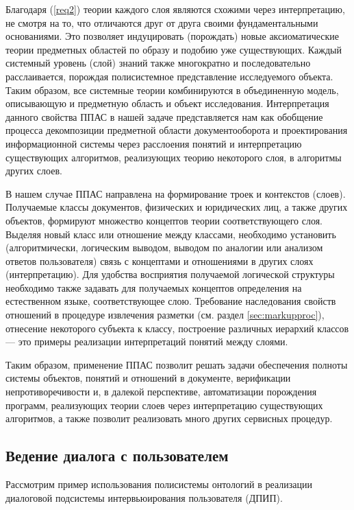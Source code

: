 \documentclass[utf8]{../IncArticle}
\begin{document}
Благодаря (\ref{req2}) теории каждого слоя являются схожими через
интерпретацию, не смотря на то, что отличаются друг от друга своими
фундаментальными основаниями.  Это позволяет индуцировать (порождать)
новые аксиоматические теории предметных областей по образу и подобию
уже существующих.  Каждый системный уровень (слой) знаний также
многократно и последовательно расслаивается, порождая полисистемное
представление исследуемого объекта.  Таким образом, все системные
теории комбинируются в объединенную модель, описывающую и предметную
область и объект исследования.  Интерпретация данного свойства ППАС в
нашей задаче представляется нам как обобщение процесса декомпозиции
предметной области документооборота и проектирования информационной
системы через расслоения понятий и интерпретацию существующих
алгоритмов, реализующих теорию некоторого слоя, в алгоритмы других
слоев.

В нашем случае ППАС направлена на формирование троек и контекстов
(слоев).  Получаемые классы документов, физических и юридических лиц,
а также других объектов, формируют множество концептов теории
соответствующего слоя.  Выделяя новый класс или отношение между
классами, необходимо установить (алгоритмически, логическим выводом,
выводом по аналогии или анализом ответов пользователя) связь с
концептами и отношениями в других слоях (интерпретацию).  Для удобства
восприятия получаемой логической структуры необходимо также задавать
для получаемых концептов определения на естественном языке,
соответствующее слою.  Требование наследования свойств отношений в
процедуре извлечения разметки (см. раздел \ref{sec:markupproc}),
отнесение некоторого субъекта к классу, построение различных иерархий
классов --- это примеры реализации интерпретаций понятий между слоями.

Таким образом, применение ППАС позволит решать задачи обеспечения
полноты системы объектов, понятий и отношений в документе, верификации
непротиворечивости и, в далекой перспективе, автоматизации порождения
программ, реализующих теории слоев через интерпретацию существующих
алгоритмов, а также позволит реализовать много других сервисных
процедур.

\subsection{Ведение диалога с пользователем}

Рассмотрим пример использования полисистемы онтологий в реализации
диалоговой подсистемы интервьюирования пользователя (ДПИП).
\end{document}
